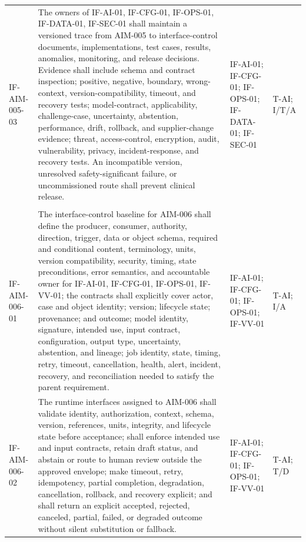 \documentclass[11pt,letterpaper]{article}
\begin{document}
\begin{scriptsize}
\begin{longtable}{@{}L{0.14\textwidth}L{0.49\textwidth}L{0.19\textwidth}L{0.10\textwidth}@{}}
\addlinespace[2pt]
\mbox{IF-AIM-005-03} & The owners of IF-AI-01, IF-CFG-01, IF-OPS-01, IF-DATA-01, IF-SEC-01 shall maintain a versioned trace from AIM-005 to interface-control documents, implementations, test cases, results, anomalies, monitoring, and release decisions. Evidence shall include schema and contract inspection; positive, negative, boundary, wrong-context, version-compatibility, timeout, and recovery tests; model-contract, applicability, challenge-case, uncertainty, abstention, performance, drift, rollback, and supplier-change evidence; threat, access-control, encryption, audit, vulnerability, privacy, incident-response, and recovery tests. An incompatible version, unresolved safety-significant failure, or uncommissioned route shall prevent clinical release. & IF-AI-01; IF-CFG-01; IF-OPS-01; IF-DATA-01; IF-SEC-01 & T-AI; I\slash\allowbreak{}T\slash\allowbreak{}A \\
\addlinespace[2pt]
 \\
\addlinespace[2pt]
\mbox{IF-AIM-006-01} & The interface-control baseline for AIM-006 shall define the producer, consumer, authority, direction, trigger, data or object schema, required and conditional content, terminology, units, version compatibility, security, timing, state preconditions, error semantics, and accountable owner for IF-AI-01, IF-CFG-01, IF-OPS-01, IF-VV-01; the contracts shall explicitly cover actor, case and object identity; version; lifecycle state; provenance; and outcome; model identity, signature, intended use, input contract, configuration, output type, uncertainty, abstention, and lineage; job identity, state, timing, retry, timeout, cancellation, health, alert, incident, recovery, and reconciliation needed to satisfy the parent requirement. & IF-AI-01; IF-CFG-01; IF-OPS-01; IF-VV-01 & T-AI; I\slash\allowbreak{}A \\
\addlinespace[2pt]
\mbox{IF-AIM-006-02} & The runtime interfaces assigned to AIM-006 shall validate identity, authorization, context, schema, version, references, units, integrity, and lifecycle state before acceptance; shall enforce intended use and input contracts, retain draft status, and abstain or route to human review outside the approved envelope; make timeout, retry, idempotency, partial completion, degradation, cancellation, rollback, and recovery explicit; and shall return an explicit accepted, rejected, canceled, partial, failed, or degraded outcome without silent substitution or fallback. & IF-AI-01; IF-CFG-01; IF-OPS-01; IF-VV-01 & T-AI; T\slash\allowbreak{}D \\

\end{longtable}
\end{scriptsize}
\end{document}
